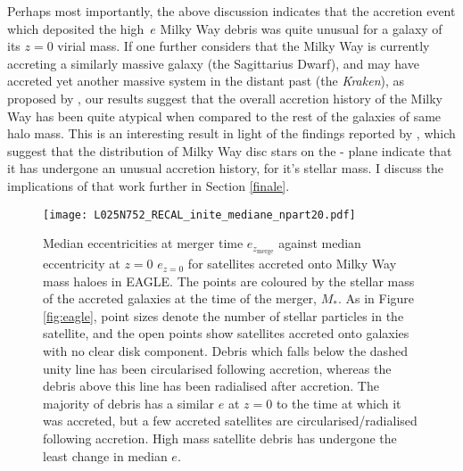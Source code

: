 Perhaps most importantly, the above discussion indicates that the
accretion event which deposited the high~$e$ Milky Way debris was
quite unusual for a galaxy of its $z=0$ virial mass.  If one further
considers that the Milky Way is currently accreting a similarly
massive galaxy (the Sagittarius Dwarf), and may have accreted
yet another massive system in the distant past (the \emph{Kraken}),
as proposed by \citet{2018MNRAS.tmp.1537K}, our results suggest
that the overall accretion history of the Milky Way has been quite
atypical when compared to the rest of the galaxies of same halo
mass. This is an interesting result in light of the findings reported
by \citet{2018MNRAS.477.5072M}, which suggest that the
distribution of Milky Way disc stars on the \afe{}-\feh{} plane
indicate that it has undergone an unusual accretion history, for
it's stellar mass.  I discuss the implications of that work further
in Section \ref{finale}.

\begin{figure}
\texttt{[image: L025N752\_RECAL\_inite\_mediane\_npart20.pdf]}
\caption[The change in median eccentricity between $z=0$ and the time immediately after merger for satellite debris accreted onto Milky Way mass haloes in the Recal-L025N0752 simulation]{\label{fig:echange} Median eccentricities at merger time
$e_{z_\mathrm{merge}}$ against median eccentricity at $z=0$ $e_{z=0}$
for satellites accreted onto Milky Way mass haloes in EAGLE. The
points are coloured by the stellar mass of the accreted galaxies
at the time of the merger, $M_*$.  As in Figure \ref{fig:eagle},
point sizes denote the number of stellar particles in the satellite,
and the open points show satellites accreted onto galaxies with no
clear disk component.  Debris which falls below the dashed unity
line has been circularised following accretion, whereas the debris
above this line has been radialised after accretion. The majority
of debris has a similar $e$ at $z=0$ to the time at which it was
accreted, but a few accreted satellites are circularised/radialised
following accretion. High mass satellite debris has undergone the
least change in median $e$.}
\end{figure}


